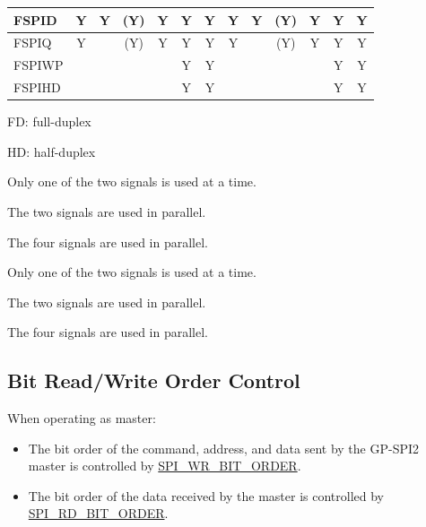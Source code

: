 \documentclass[main\_\_EN.tex]{subfiles}
\begin{document}
\begin{landscape}
\begin{table}[H]
\begin{threeparttable}
\begin{tabular}{ |p{2.0cm} |c|c|c|c|c|c|c|c|c|c|c|c| }
FSPID                    & Y       & Y       & (Y)\tnote{3}      & Y\tnote{4}      & Y\tnote{5}      & Y      & Y       & Y      & (Y)\tnote{6}      & Y\tnote{7}     & Y\tnote{8}     & Y      \\ \hline
FSPIQ                    & Y       &         & (Y)\tnote{3}      & Y\tnote{4}      & Y\tnote{5}      & Y      & Y       &        & (Y)\tnote{6}     & Y\tnote{7}     & Y\tnote{8}      & Y      \\ \hline
FSPIWP                   &         &         &         &         & Y\tnote{5}      & Y      &         &        &         &         & Y\tnote{8}       & Y      \\ \hline
FSPIHD                   &         &         &         &         & Y\tnote{5}      & Y      &         &        &         &         & Y\tnote{8}       & Y      \\ \hline
\end{tabular}

        \begin{tablenotes}
                \item[1] FD: full-duplex
                \item[2] HD: half-duplex
                \item[3] Only one of the two signals is used at a time.
                \item[4] The two signals are used in parallel.
                \item[5] The four signals are used in parallel.
                \item[6] Only one of the two signals is used at a time.
                \item[7] The two signals are used in parallel.
                \item[8] The four signals are used in parallel.
        \end{tablenotes}
     \end{threeparttable}
    \end{table}
\end{landscape}

\subsection{Bit Read/Write Order Control}

When operating as master:

\begin{itemize}
    \item The bit order of the command, address, and data sent by the GP-SPI2 master is controlled by \hyperref[fielddesc:SPIWRBITORDER]{SPI\_WR\_BIT\_ORDER}.
    \item The bit order of the data received by the master is controlled by \hyperref[fielddesc:SPIRDBITORDER]{SPI\_RD\_BIT\_ORDER}.
\end{itemize}
\end{document}
